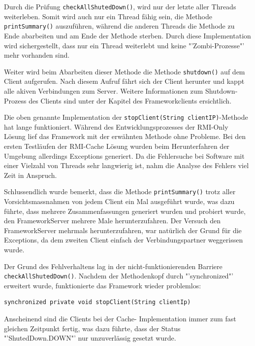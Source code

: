 Durch die Prüfung \texttt{checkAllShutedDown()}, wird nur der letzte aller Threads weiterleben. Somit wird auch nur ein Thread fähig sein, die Methode \texttt{printSummary()} auszuführen, während die anderen Threads die Methode zu Ende abarbeiten und am Ende der Methode sterben. Durch diese Implementation wird sichergestellt, dass nur ein Thread weiterlebt und keine "'Zombi-Prozesse"' mehr vorhanden sind.

Weiter wird beim Abarbeiten dieser Methode die Methode \texttt{shutdown()} auf dem Client aufgerufen. Nach diesem Aufruf fährt sich der Client herunter und kappt alle akiven Verbindungen zum Server. Weitere Informationen zum Shutdown-Prozess des Clients sind unter der Kapitel des Frameworkclients ersichtlich.

Die oben genannte Implementation der \texttt{stopClient(String clientIP)}-\-Me\-tho\-de hat lange funktioniert. Während des Entwicklungsprozesses der RMI-Only Lösung lief das Framework mit der erwähnten Methode ohne Probleme. Bei den ersten Testläufen der RMI-Cache Lösung wurden beim Herunterfahren der Umgebung allerdings Exceptions generiert. Da die Fehlersuche bei Software mit einer Vielzahl von Threads sehr langwierig ist, nahm die Analyse des Fehlers viel Zeit in Anspruch.

Schlussendlich wurde bemerkt, dass die Methode \texttt{printSummary()} trotz aller Vorsichtsmassnahmen von jedem Client ein Mal ausgeführt wurde, was dazu führte, dass mehrere Zusammenfassungen generiert wurden und probiert wurde, den FrameworkServer mehrere Male herunterzufahren. Der Versuch den FrameworkServer mehrmals herunterzufahren, war natürlich der Grund für die Ex\-cep\-tions, da dem zweiten Client ein\-fach der Ver\-bin\-dungs\-part\-ner weggerissen wurde.

Der Grund des Fehlverhaltens lag in der nicht-funktionierenden Barriere \texttt{checkAllShutedDown()}. Nachdem der Methodenkopf durch "'synchronized"' erweitert wurde, funktionierte das Framework wieder problemlos:
\begin{verbatim}
synchronized private void stopClient(String clientIp)
\end{verbatim}
Anscheinend sind die Clients bei der Cache- Implementation immer zum fast gleichen Zeit\-punkt fer\-tig, was dazu führte, dass der Sta\-tus "'Shuted\-Down\-.DOWN"' nur un\-zu\-ver\-läs\-sig gesetzt wurde.

